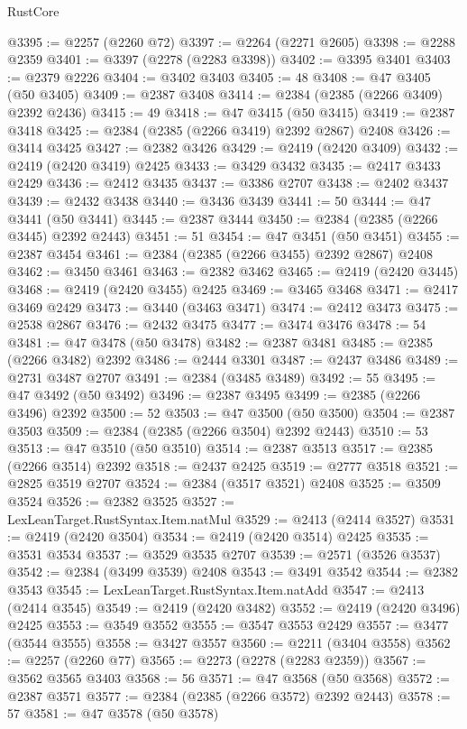 \begin{lexlean}{RustCore}
\begin{coremodule}
@3395 := @2257 (@2260 @72)
@3397 := @2264 (@2271 @2605)
@3398 := @2288 @2359
@3401 := @3397 (@2278 (@2283 @3398))
@3402 := @3395 @3401
@3403 := @2379 @2226
@3404 := @3402 @3403
@3405 := 48
@3408 := @47 @3405 (@50 @3405)
@3409 := @2387 @3408
@3414 := @2384 (@2385 (@2266 @3409) @2392 @2436)
@3415 := 49
@3418 := @47 @3415 (@50 @3415)
@3419 := @2387 @3418
@3425 := @2384 (@2385 (@2266 @3419) @2392 @2867) @2408
@3426 := @3414 @3425
@3427 := @2382 @3426
@3429 := @2419 (@2420 @3409)
@3432 := @2419 (@2420 @3419) @2425
@3433 := @3429 @3432
@3435 := @2417 @3433 @2429
@3436 := @2412 @3435
@3437 := @3386 @2707
@3438 := @2402 @3437
@3439 := @2432 @3438
@3440 := @3436 @3439
@3441 := 50
@3444 := @47 @3441 (@50 @3441)
@3445 := @2387 @3444
@3450 := @2384 (@2385 (@2266 @3445) @2392 @2443)
@3451 := 51
@3454 := @47 @3451 (@50 @3451)
@3455 := @2387 @3454
@3461 := @2384 (@2385 (@2266 @3455) @2392 @2867) @2408
@3462 := @3450 @3461
@3463 := @2382 @3462
@3465 := @2419 (@2420 @3445)
@3468 := @2419 (@2420 @3455) @2425
@3469 := @3465 @3468
@3471 := @2417 @3469 @2429
@3473 := @3440 (@3463 @3471)
@3474 := @2412 @3473
@3475 := @2538 @2867
@3476 := @2432 @3475
@3477 := @3474 @3476
@3478 := 54
@3481 := @47 @3478 (@50 @3478)
@3482 := @2387 @3481
@3485 := @2385 (@2266 @3482) @2392
@3486 := @2444 @3301
@3487 := @2437 @3486
@3489 := @2731 @3487 @2707
@3491 := @2384 (@3485 @3489)
@3492 := 55
@3495 := @47 @3492 (@50 @3492)
@3496 := @2387 @3495
@3499 := @2385 (@2266 @3496) @2392
@3500 := 52
@3503 := @47 @3500 (@50 @3500)
@3504 := @2387 @3503
@3509 := @2384 (@2385 (@2266 @3504) @2392 @2443)
@3510 := 53
@3513 := @47 @3510 (@50 @3510)
@3514 := @2387 @3513
@3517 := @2385 (@2266 @3514) @2392
@3518 := @2437 @2425
@3519 := @2777 @3518
@3521 := @2825 @3519 @2707
@3524 := @2384 (@3517 @3521) @2408
@3525 := @3509 @3524
@3526 := @2382 @3525
@3527 := LexLeanTarget.RustSyntax.Item.natMul
@3529 := @2413 (@2414 @3527)
@3531 := @2419 (@2420 @3504)
@3534 := @2419 (@2420 @3514) @2425
@3535 := @3531 @3534
@3537 := @3529 @3535 @2707
@3539 := @2571 (@3526 @3537)
@3542 := @2384 (@3499 @3539) @2408
@3543 := @3491 @3542
@3544 := @2382 @3543
@3545 := LexLeanTarget.RustSyntax.Item.natAdd
@3547 := @2413 (@2414 @3545)
@3549 := @2419 (@2420 @3482)
@3552 := @2419 (@2420 @3496) @2425
@3553 := @3549 @3552
@3555 := @3547 @3553 @2429
@3557 := @3477 (@3544 @3555)
@3558 := @3427 @3557
@3560 := @2211 (@3404 @3558)
@3562 := @2257 (@2260 @77)
@3565 := @2273 (@2278 (@2283 @2359))
@3567 := @3562 @3565 @3403
@3568 := 56
@3571 := @47 @3568 (@50 @3568)
@3572 := @2387 @3571
@3577 := @2384 (@2385 (@2266 @3572) @2392 @2443)
@3578 := 57
@3581 := @47 @3578 (@50 @3578)

\end{coremodule}
\end{lexlean}
